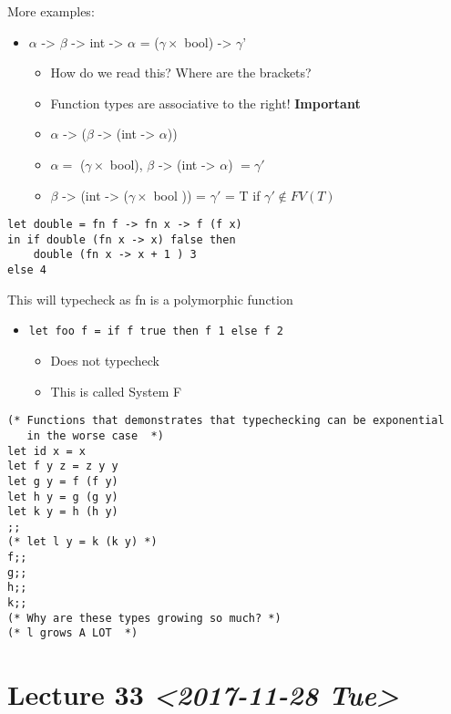 \documentclass[11pt]{article}
\begin{document}
More examples: 
\begin{itemize}
\item \(\alpha\) -> \(\beta\) -> int -> \(\alpha\) = (\(\gamma \times\) bool) -> \(\gamma\)'
\begin{itemize}
\item How do we read this? Where are the brackets?
\item Function types are associative to the right! \textbf{Important}
\item \(\alpha\) -> (\(\beta\) -> (int -> \(\alpha\)))
\item \(\alpha =\) (\(\gamma \times\) bool), \(\beta\) -> (int -> \(\alpha\)) \(=\gamma'\)
\item \(\beta\) -> (int -> (\(\gamma \times\) bool )) = \(\gamma'\) = T if \(\gamma' \notin FV(T)\)
\end{itemize}
\end{itemize}

\begin{verbatim}
let double = fn f -> fn x -> f (f x)
in if double (fn x -> x) false then
    double (fn x -> x + 1 ) 3
else 4
\end{verbatim}
This will typecheck as fn is a polymorphic function
\begin{itemize}
\item \texttt{let foo f = if f true then f 1 else f 2}
\begin{itemize}
\item Does not typecheck
\item This is called System F
\end{itemize}
\end{itemize}
\begin{verbatim}
(* Functions that demonstrates that typechecking can be exponential 
   in the worse case  *)
let id x = x
let f y z = z y y
let g y = f (f y)
let h y = g (g y)
let k y = h (h y)
;;
(* let l y = k (k y) *)
f;;
g;;
h;;
k;;
(* Why are these types growing so much? *)
(* l grows A LOT  *)
\end{verbatim}
\section{Lecture 33 \textit{<2017-11-28 Tue>}}
\label{sec:org3b09c04}
\end{document}
